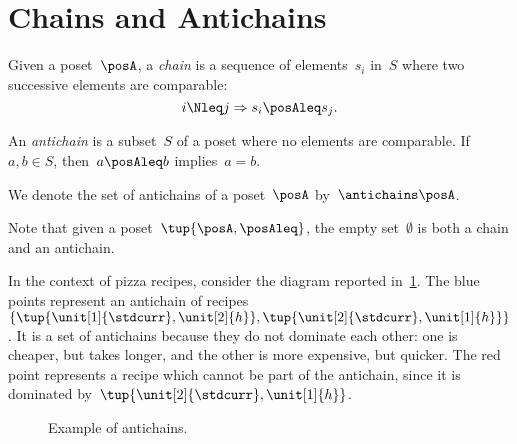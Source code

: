 

\section{Chains and Antichains}
\label{sec:chains-antichains}

\begin{definition}
  \label{def:chain}
  Given a poset~$\posA$, a \emph{chain} is a sequence of elements~${s_i}$ in~$S$ where two successive elements are comparable:
  \begin{equation}
    i \Nleq j \Rightarrow s_i \posAleq s_j.
  \end{equation}
\end{definition}


\begin{definition}
  \label{def:antichain}
  An \emph{antichain} is a subset~$S$ of a poset where no elements are comparable.
  If~$a,b \in S$, then~$a \posAleq b$ implies~$a=b$.
\end{definition}

We denote the set of antichains of a poset~$\posA$ by~$\antichains\posA$.

\begin{remark}
  Note that given a poset~$\tup{\posA,\posAleq}$, the empty set~$\emptyset$ is both a chain and an antichain.
\end{remark}

In the context of pizza recipes, consider the diagram reported in~\cref{fig:antichain}.
The blue points represent an antichain of recipes~$\{\tup{\unit[1]{\stdcurr},\unit[2]{h}},\tup{\unit[2]{\stdcurr},\unit[1]{h}}\}$.
It is a set of antichains because they do not dominate each other: one is cheaper, but takes longer, and the other is more expensive, but quicker.
The red point represents a recipe which cannot be part of the antichain, since it is dominated by~$\tup{\unit[2]{\stdcurr},\unit[1]{h}}$.

\begin{figure}[h!]
  \begin{center}
  \end{center}
  \caption{Example of antichains. }
  \label{fig:antichain}
\end{figure}


